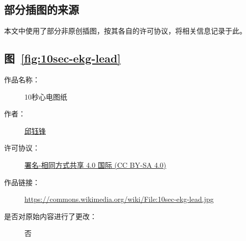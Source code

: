 \begin{appendix}

    \begingroup
    \renewcommand{\clearpage}{\relax}
    \listoftodos
    \endgroup

    \listoffigures
    \listoffigureEng


    \chapter*{部分插图的来源}\label{ch:license}

    本文中使用了部分非原创插图，按其各自的许可协议，将相关信息记录于此。

    \section*{图~\ref{fig:10sec-ekg-lead}}

    \begin{description}
        \item[作品名称：]10秒心电图纸
        \item[作者：]\href{https://zh.wikipedia.org/wiki/User:Kuyohong}{邱钰锋}
        \item[许可协议：]\href{https://creativecommons.org/licenses/by/4.0/}{署名-相同方式共享 4.0 国际 (CC BY-SA 4.0)}
        \item[作品链接：]\url{https://commons.wikimedia.org/wiki/File:10sec-ekg-lead.jpg}
        \item[是否对原始内容进行了更改：]否
    \end{description}

\end{appendix}
